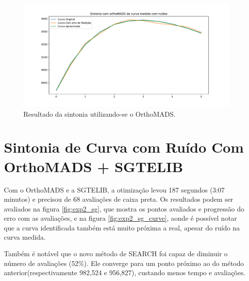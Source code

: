 \begin{figure}
\centering
  \includegraphics[width=1\linewidth]{figs/curva_om.pdf}
  \caption{Resultado da sintonia utilizando-se o OrthoMADS.}
  \label{fig:exp2_om_curve}
\end{figure}




\section{Sintonia de Curva com Ruído Com OrthoMADS + SGTELIB}

Com o OrthoMADS e a SGTELIB, a otimização levou 187 segundos (3:07 minutos) e precisou de 68 avaliações de caixa preta. Os resultados podem ser avaliados na figura \ref{fig:exp2_sg}, que mostra os pontos avaliados e progressão do erro com as avaliações, e na figura \ref{fig:exp2_sg_curve}, aonde é possível notar que a curva identificada também está muito próxima a real, apesar do ruído na curva medida. 
%

Também é notável que o novo método de SEARCH foi capaz de diminuir o número de avaliações (52\%).
%
Ele converge para um ponto próximo ao do método anterior(respectivamente 982,524 e 956,827), custando menos tempo e avaliações.


